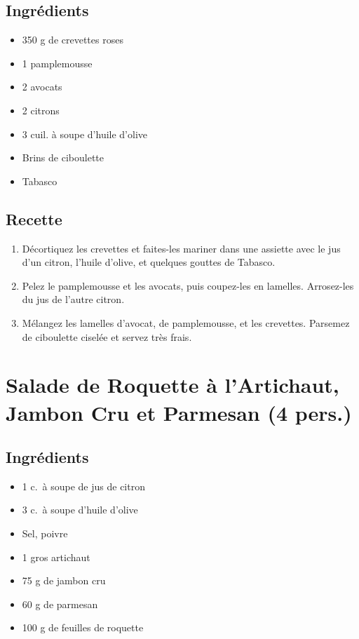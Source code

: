 \subsection{Ingrédients}\label{ingruxe9dients-14}

\begin{itemize}

\item
  350 g de crevettes roses
\item
  1 pamplemousse
\item
  2 avocats
\item
  2 citrons
\item
  3 cuil. à soupe d'huile d'olive
\item
  Brins de ciboulette
\item
  Tabasco
\end{itemize}

\subsection{Recette}\label{recette-9}

\begin{enumerate}
\def\labelenumi{\arabic{enumi}.}

\item
  Décortiquez les crevettes et faites-les mariner dans une assiette avec
  le jus d'un citron, l'huile d'olive, et quelques gouttes de Tabasco.
\item
  Pelez le pamplemousse et les avocats, puis coupez-les en lamelles.
  Arrosez-les du jus de l'autre citron.
\item
  Mélangez les lamelles d'avocat, de pamplemousse, et les crevettes.
  Parsemez de ciboulette ciselée et servez très frais.
\end{enumerate}

\section{Salade de Roquette à l'Artichaut, Jambon Cru et Parmesan (4
pers.)}\label{salade-de-roquette-uxe0-lartichaut-jambon-cru-et-parmesan-4-pers.}

\subsection{Ingrédients}\label{ingruxe9dients-15}

\begin{itemize}

\item
  1 c.~à soupe de jus de citron
\item
  3 c.~à soupe d'huile d'olive
\item
  Sel, poivre
\item
  1 gros artichaut
\item
  75 g de jambon cru
\item
  60 g de parmesan
\item
  100 g de feuilles de roquette
\end{itemize}

